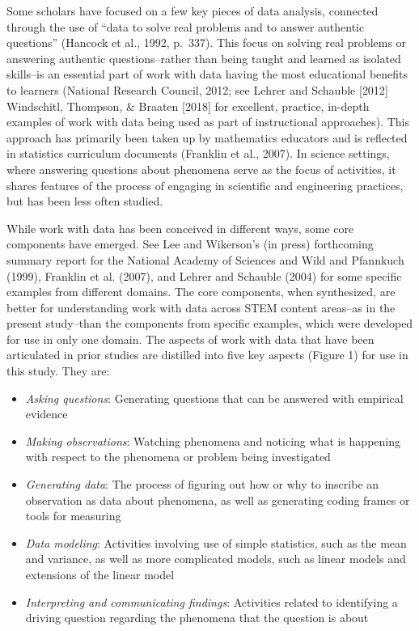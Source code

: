 \documentclass[]{book}
\providecommand{\tightlist}{%
  \setlength{\itemsep}{0pt}\setlength{\parskip}{0pt}}
\theoremstyle{definition}
\theoremstyle{definition}
\theoremstyle{definition}
\theoremstyle{remark}
\begin{document}
Some scholars have focused on a few key pieces of data analysis,
connected through the use of ``data to solve real problems and to answer
authentic questions'' (Hancock et al., 1992, p.~337). This focus on
solving real problems or answering authentic questions--rather than
being taught and learned as isolated skills--is an essential part of
work with data having the most educational benefits to learners
(National Research Council, 2012; see Lehrer and Schauble {[}2012{]}
Windschitl, Thompson, \& Braaten {[}2018{]} for excellent, practice,
in-depth examples of work with data being used as part of instructional
approaches). This approach has primarily been taken up by mathematics
educators and is reflected in statistics curriculum documents (Franklin
et al., 2007). In science settings, where answering questions about
phenomena serve as the focus of activities, it shares features of the
process of engaging in scientific and engineering practices, but has
been less often studied.

While work with data has been conceived in different ways, some core
components have emerged. See Lee and Wikerson's (in press) forthcoming
summary report for the National Academy of Sciences and Wild and
Pfannkuch (1999), Franklin et al. (2007), and Lehrer and Schauble (2004)
for some specific examples from different domains. The core components,
when synthesized, are better for understanding work with data across
STEM content areas--as in the present study--than the components from
specific examples, which were developed for use in only one domain. The
aspects of work with data that have been articulated in prior studies
are distilled into five key aspects (Figure 1) for use in this study.
They are:

\begin{itemize}
\tightlist
\item
  \emph{Asking questions}: Generating questions that can be answered
  with empirical evidence
\item
  \emph{Making observations}: Watching phenomena and noticing what is
  happening with respect to the phenomena or problem being investigated
\item
  \emph{Generating data}: The process of figuring out how or why to
  inscribe an observation as data about phenomena, as well as generating
  coding frames or tools for measuring
\item
  \emph{Data modeling}: Activities involving use of simple statistics,
  such as the mean and variance, as well as more complicated models,
  such as linear models and extensions of the linear model
\item
  \emph{Interpreting and communicating findings}: Activities related to
  identifying a driving question regarding the phenomena that the
  question is about
\end{itemize}
\end{document}
